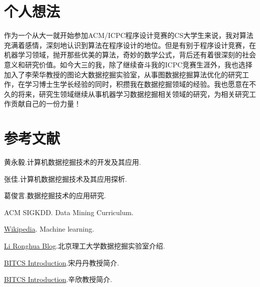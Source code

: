 \documentclass{misc/elegantpaper}
\begin{document}
\section{个人想法}

作为一个从大一就开始参加ACM/ICPC程序设计竞赛的CS大学生来说，我对算法充满着感情，深刻地认识到算法在程序设计的地位。但是有别于程序设计竞赛，在机器学习领域，抛开那些优美的算法，奇妙的数学公式，背后还有着很深刻的社会意义和研究价值。如今大三的我，除了继续奋斗我的ICPC竞赛生涯外，我也选择加入了李荣华教授的图论大数据挖掘实验室，从事图数据挖掘算法优化的研究工作，在学习博士生学长经验的同时，积攒我在数据挖掘领域的经验。我也愿意在不久的将来，研究生领域继续从事机器学习数据挖掘相关领域的研究，为相关研究工作贡献自己的一份力量！

\section{参考文献}

\noindent [1] 黄永毅.计算机数据挖掘技术的开发及其应用.

\noindent [2] 张佳.计算机数据挖掘技术及其应用探析.

\noindent [3] 葛俊言.数据挖掘技术的应用研究.

\noindent [4] ACM SIGKDD. Data Mining Curriculum.

\noindent [5] \href{https://en.wikipedia.org/wiki/Machine_learning}{Wikipedia}. Machine learning.

\noindent [6] \href{https://ronghuali.github.io/}{Li Ronghua Blog}.北京理工大学数据挖掘实验室介绍.

\noindent [7] \href{http://cs.bit.edu.cn/szdw/jsml/js/sdd_20170821091432439000/index.htm}{BITCS Introduction}.宋丹丹教授简介.

\noindent [8] \href{http://cs.bit.edu.cn/szdw/jsml/fjs/xx/index.htm}{BITCS Introduction}.辛欣教授简介.
\end{document}
